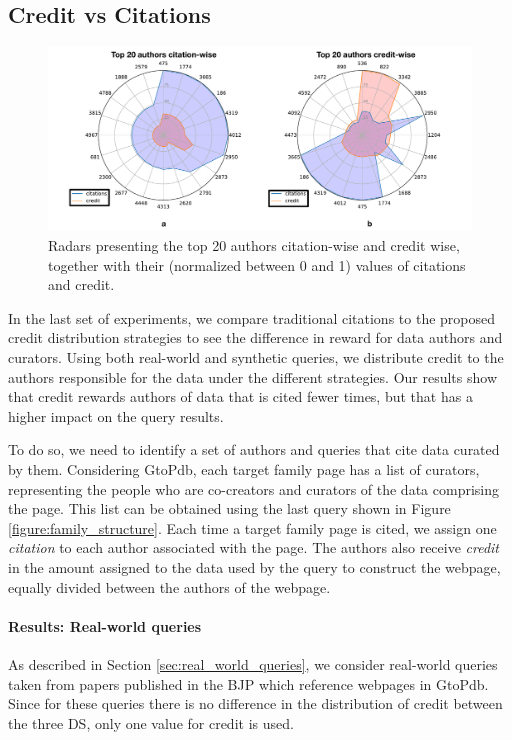
\subsection{Credit vs Citations}

\begin{figure}[]
\centering
  \includegraphics[width=1\textwidth]{figures/2_radars}
  \caption{Radars presenting the top 20 authors citation-wise and credit wise, together with their (normalized between 0 and 1) values of citations and credit.}
  \label{figure:2_radars}
\end{figure}

In the last set of experiments, we compare traditional citations to the proposed credit distribution strategies to see the difference in reward for data authors and curators.  
\textcolor{correction}{Using both real-world and synthetic queries, we distribute credit to the authors responsible for the data under the different strategies. Our results show that credit rewards authors of data that is cited fewer times, but that has a higher impact on the query results.} 

\textcolor{correction}{To do so, we need to identify a set of authors and queries that cite data curated by them.}  
Considering GtoPdb, each target family page has a list of curators, representing the people who are co-creators and curators of the data comprising the page. This list can be obtained using the last query shown in Figure \ref{figure:family_structure}. 
Each time a target family page is cited, we assign one {\em citation} to each author associated with the page.  The authors also receive {\em credit} in the amount assigned to the data used by the query to construct the webpage, equally divided between the authors of the webpage.


\paragraph{Results: Real-world queries}
As described in Section \ref{sec:real_world_queries}, we consider real-world queries taken from papers published in the BJP which reference webpages in GtoPdb.
Since for these queries there is no difference in the distribution of credit between the three DS, only one value for credit is used.

